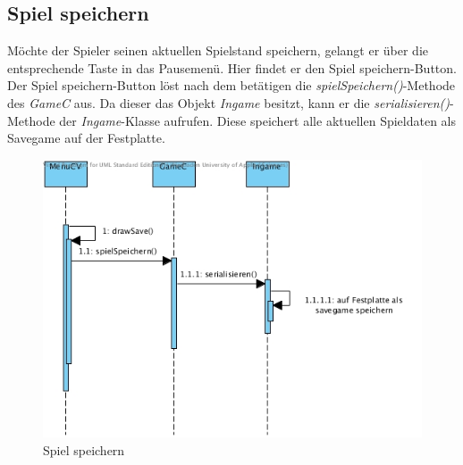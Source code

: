 \newpage

\subsection{Spiel speichern}
Möchte der Spieler seinen aktuellen Spielstand speichern, gelangt er über die entsprechende Taste in das
Pausemenü. Hier findet er den Spiel speichern-Button. Der Spiel speichern-Button löst nach dem betätigen die 
\textit{spielSpeichern()}-Methode des \textit{GameC} aus. Da dieser das Objekt \textit{Ingame} besitzt, kann er die 
\textit{serialisieren()}-Methode der \textit{Ingame}-Klasse aufrufen. Diese speichert alle aktuellen Spieldaten als 
Savegame auf der Festplatte.

\begin{figure}[h]
	\begin{center}
		\includegraphics[trim=0cm 0cm 0cm 0cm, clip=true, width=13cm]{kapitel/laufzeitsicht/spiel_speichern.jpg}
	\end{center}
	\caption{Spiel speichern}
	\label{fig:speichern_uml}
\end{figure}
\newpage
